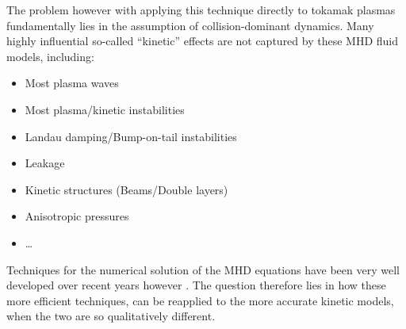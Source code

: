     The problem however with applying this technique directly to tokamak plasmas fundamentally lies in the assumption of collision-dominant dynamics.  Many highly influential so-called ``kinetic'' effects are not captured by these MHD fluid models, including: 
    \begin{itemize}
        \item  Most plasma waves
        \item  Most plasma/kinetic instabilities
        \item  Landau damping/Bump-on-tail instabilities
        \item  Leakage
        \item  Kinetic structures (Beams/Double layers)
        \item  Anisotropic pressures
        \item  …
    \end{itemize}
    Techniques for the numerical solution of the MHD equations have been very well developed over recent years however . The question therefore lies in how these more efficient techniques, can be reapplied to the more accurate kinetic models, when the two are so qualitatively different.
    

    